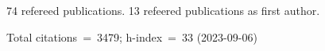 74 refereed publications. 13 refeered publications as first author.

Total citations~=~3479; h-index~=~33 (2023-09-06)